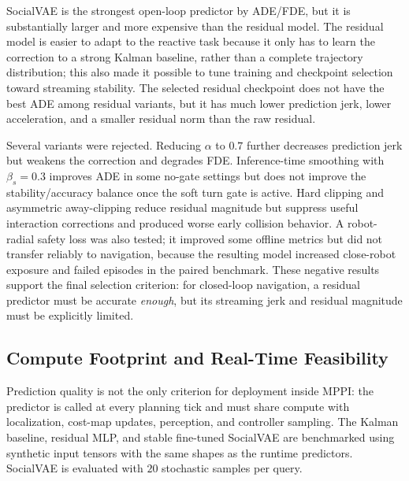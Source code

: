 \documentclass[12pt, a4paper]{article}
\begin{document}
SocialVAE is the strongest open-loop predictor by ADE/FDE, but it is substantially larger and more expensive than the residual model. The residual model is easier to adapt to the reactive task because it only has to learn the correction to a strong Kalman baseline, rather than a complete trajectory distribution; this also made it possible to tune training and checkpoint selection toward streaming stability. The selected residual checkpoint does not have the best ADE among residual variants, but it has much lower prediction jerk, lower acceleration, and a smaller residual norm than the raw residual.

Several variants were rejected. Reducing $\alpha$ to $0.7$ further decreases prediction jerk but weakens the correction and degrades FDE. Inference-time smoothing with $\beta_s=0.3$ improves ADE in some no-gate settings but does not improve the stability/accuracy balance once the soft turn gate is active. Hard clipping and asymmetric away-clipping reduce residual magnitude but suppress useful interaction corrections and produced worse early collision behavior. A robot-radial safety loss was also tested; it improved some offline metrics but did not transfer reliably to navigation, because the resulting model increased close-robot exposure and failed episodes in the paired benchmark. These negative results support the final selection criterion: for closed-loop navigation, a residual predictor must be accurate \emph{enough}, but its streaming jerk and residual magnitude must be explicitly limited.

\subsection{Compute Footprint and Real-Time Feasibility}
\label{sec:res-compute}

Prediction quality is not the only criterion for deployment inside MPPI: the predictor is called at every planning tick and must share compute with localization, cost-map updates, perception, and controller sampling. The Kalman baseline, residual MLP, and stable fine-tuned SocialVAE are benchmarked using synthetic input tensors with the same shapes as the runtime predictors. SocialVAE is evaluated with $20$ stochastic samples per query.
\end{document}
